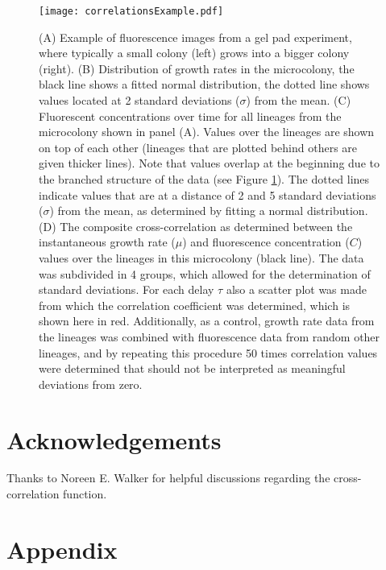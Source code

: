 {\begin{figure}
	\centering
	\texttt{[image: correlationsExample.pdf]}
	\caption{ 
		(A) Example of fluorescence images from a gel pad experiment, where typically a small colony (left) grows into a bigger colony (right).
		(B) Distribution of growth rates in the microcolony, the black line shows a fitted normal distribution, the dotted line shows values located at 2 standard deviations ($\sigma$) from the mean.
		(C) Fluorescent concentrations over time for all lineages from the microcolony shown in panel (A). Values over the lineages are shown on top of each other (lineages that are plotted behind others are given thicker lines). Note that values overlap at the beginning due to the branched structure of the data (see Figure \ref{fig:mm:weighingCCs}). The dotted lines indicate values that are at a distance of 2 and 5 standard deviations ($\sigma$) from the mean, as determined by fitting a normal distribution.
		(D) The composite cross-correlation as determined between the instantaneous growth rate ($\mu$) and fluorescence concentration ($C$) values over the lineages in this microcolony (black line). The data was subdivided in 4 groups, which allowed for the determination of standard deviations. For each delay $\tau$ also a scatter plot was made from which the correlation coefficient was determined, which is shown here in red. Additionally, as a control, growth rate data from the lineages was combined with fluorescence data from random other lineages, and by repeating this procedure 50 times correlation values were determined that should not be interpreted as meaningful deviations from zero.
	}
	\label{fig:mm:weighingCCs}
\end{figure}





\section*{Acknowledgements}
Thanks to Noreen E. Walker for helpful discussions regarding the cross-correlation function.

\clearpage
\section*{Appendix}

}
